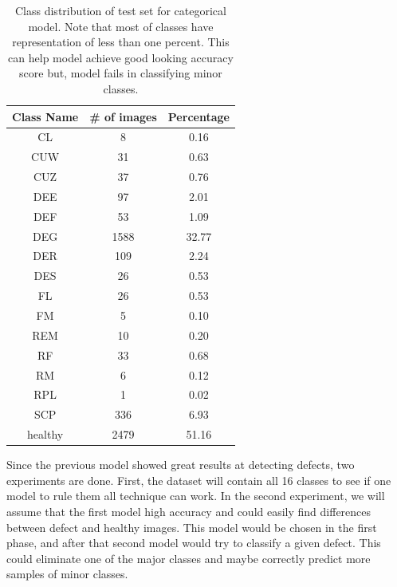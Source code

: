 \documentclass[thesis=B,english]{FITthesis}[2019/12/23]
\begin{document}
\begin{table}[ht!]
    \centering
    \begin{tabular}{|c|c|c|}\hline
        Class Name & \# of images & Percentage\\\hline\hline
        CL      & 8     & 0.16\\\hline
        CUW     & 31    & 0.63\\\hline
        CUZ     & 37    & 0.76\\\hline
        DEE     & 97    & 2.01\\\hline
        DEF     & 53    & 1.09\\\hline
        DEG     & 1588  & 32.77\\\hline
        DER     & 109   & 2.24\\\hline
        DES     & 26    & 0.53\\\hline
        FL      & 26    & 0.53\\\hline
        FM      & 5     & 0.10\\\hline
        REM     & 10    & 0.20\\\hline
        RF      & 33    & 0.68\\\hline
        RM      & 6     & 0.12\\\hline
        RPL     & 1     & 0.02\\\hline
        SCP     & 336   & 6.93\\\hline
        healthy & 2479  & 51.16\\\hline
    \end{tabular}
    \caption[Class distribution]{Class distribution of test set for categorical model. Note that most of classes have representation of less than one percent. This can help model achieve good looking accuracy score but, model fails in classifying minor classes.}
    \label{tab:class_distribution}
\end{table}

Since the previous model showed great results at detecting defects, two experiments are done. First, the dataset will contain all 16 classes to see if one model to rule them all technique can work. In the second experiment, we will assume that the first model high accuracy and could easily find differences between defect and healthy images. This model would be chosen in the first phase, and after that second model would try to classify a given defect. This could eliminate one of the major classes and maybe correctly predict more samples of minor classes.
\end{document}
